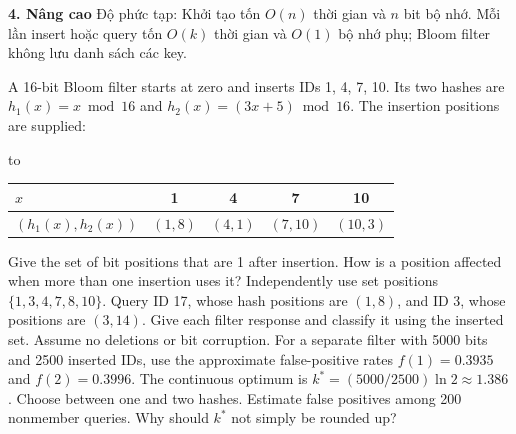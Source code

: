 \documentclass[10pt,a4paper,twocolumn]{article}
\newcommand{\key}[1]{#1:\enspace}
\newenvironment{examtable}[1]{%
  \par\addvspace{2pt}\noindent\hbox to \linewidth\bgroup\hfil
  \setlength{\tabcolsep}{4pt}%
  \renewcommand{\arraystretch}{1.12}\begin{tabular}{#1}%
}{\end{tabular}\hfil\egroup\par\addvspace{2pt}}
\newcommand{\unitheading}[2]{%
  \par\addvspace{1pt}\noindent\textbf{#1. #2}\enspace}
\newcommand{\unitadvanced}{\unitheading{4}{Nâng cao}}
\begin{document}
\unitadvanced
\key{Độ phức tạp} Khởi tạo tốn $O(n)$ thời gian và $n$ bit bộ nhớ. Mỗi lần insert hoặc query tốn $O(k)$ thời gian và $O(1)$ bộ nhớ phụ; Bloom filter không lưu danh sách các key.

A 16-bit Bloom filter starts at zero and inserts IDs 1, 4, 7, 10. Its two hashes are $h_1(x)=x\bmod16$ and $h_2(x)=(3x+5)\bmod16$. The insertion positions are supplied:
\begin{examtable}{@{}lcccc@{}}
\toprule
$x$ & 1 & 4 & 7 & 10\\
\midrule
$(h_1(x),h_2(x))$ & $(1,8)$ & $(4,1)$ & $(7,10)$ & $(10,3)$\\
\bottomrule
\end{examtable}
 Give the set of bit positions that are 1 after insertion. How is a position affected when more than one insertion uses it?
 Independently use set positions $\{1,3,4,7,8,10\}$. Query ID 17, whose hash positions are $(1,8)$, and ID 3, whose positions are $(3,14)$. Give each filter response and classify it using the inserted set. Assume no deletions or bit corruption.
 For a separate filter with 5000 bits and 2500 inserted IDs, use the approximate false-positive rates $f(1)=0.3935$ and $f(2)=0.3996$. The continuous optimum is $k^*=(5000/2500)\ln2\approx1.386$. Choose between one and two hashes. Estimate false positives among 200 nonmember queries. Why should $k^*$ not simply be rounded up?
\end{document}
